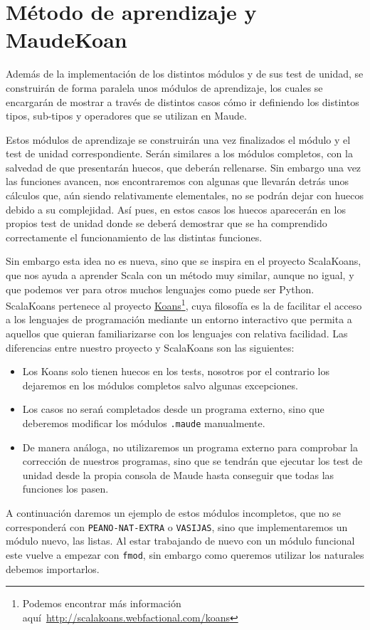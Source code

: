\section{Método de aprendizaje y MaudeKoan}

Además de la implementación de los distintos módulos y de sus test de unidad, se construirán de forma paralela unos módulos de aprendizaje, los cuales se encargarán de mostrar a través de distintos casos cómo ir definiendo los distintos tipos, sub-tipos y operadores que se utilizan en Maude.\par

Estos módulos de aprendizaje se construirán una vez finalizados el módulo y el test de unidad correspondiente. Serán similares a los módulos completos, con la salvedad de que presentarán huecos, que deberán rellenarse. Sin embargo una vez las funciones avancen, nos encontraremos con algunas que llevarán detrás unos cálculos que, aún siendo relativamente elementales, no se podrán dejar con huecos debido a su complejidad. Así pues, en estos casos los huecos aparecerán en los propios test de unidad donde se deberá demostrar que se ha comprendido correctamente el funcionamiento de las distintas funciones. \par

Sin embargo esta idea no es nueva, sino que se inspira en el proyecto ScalaKoans, que nos ayuda a aprender Scala con un método muy similar, aunque no igual, y que podemos ver para otros muchos lenguajes como puede ser Python. ScalaKoans pertenece al proyecto \href{http://scalakoans.webfactional.com/koans}{Koans}\footnote{Podemos encontrar más información aquí~\url{http://scalakoans.webfactional.com/koans}}, cuya filosofía es la de facilitar el acceso a los lenguajes de programación mediante un entorno interactivo que permita a aquellos que quieran familiarizarse con los lenguajes con relativa facilidad. Las diferencias entre nuestro proyecto y ScalaKoans son las siguientes:\par
\begin{itemize}
\item Los Koans solo tienen huecos en los tests, nosotros por el contrario los dejaremos en los módulos completos salvo algunas excepciones.
\item Los casos no serań completados desde un programa externo, sino que deberemos modificar los módulos \texttt{.maude} manualmente.
\item De manera análoga, no utilizaremos un programa externo para comprobar la corrección de nuestros programas, sino que se tendrán que ejecutar los test de unidad desde la propia consola de Maude hasta conseguir que todas las funciones los pasen.
\end{itemize}
 A continuación daremos un ejemplo de estos módulos incompletos, que no se corresponderá con \texttt{PEANO-NAT-EXTRA} o \texttt{VASIJAS}, sino que implementaremos un módulo nuevo, las listas. Al estar trabajando de nuevo con un módulo funcional este vuelve a empezar con \verb"fmod", sin embargo como queremos utilizar los naturales debemos importarlos. \par

